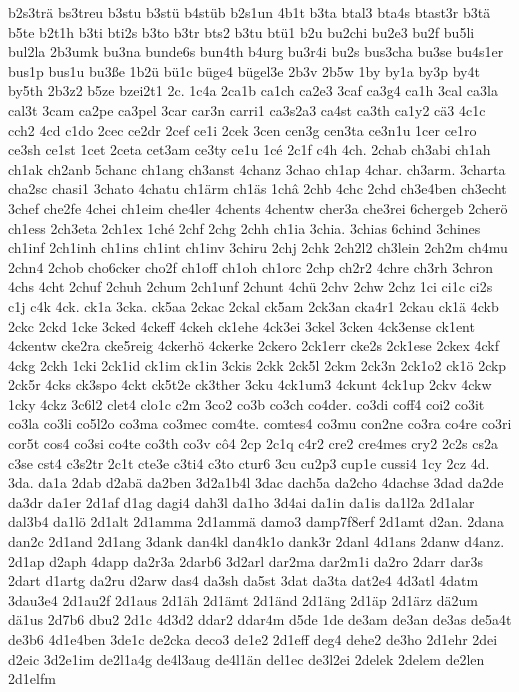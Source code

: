 {b2s3trä
bs3treu
b3stu
b3stü
b4stüb
b2s1un
4b1t
b3ta
btal3
bta4s
btast3r
b3tä
b5te
b2t1h
b3ti
bti2s
b3to
b3tr
bts2
b3tu
btü1
b2u
bu2chi
bu2e3
bu2f
bu5li
bul2la
2b3umk
bu3na
bunde6s
bun4th
b4urg
bu3r4i
bu2s
bus3cha
bu3se
bu4s1er
bus1p
bus1u
bu3ße
1b2ü
bü1c
büge4
bügel3e
2b3v
2b5w
1by
by1a
by3p
by4t
by5th
2b3z2
b5ze
bzei2t1
2c.
1c4a
2ca1b
ca1ch
ca2e3
3caf
ca3g4
ca1h
3cal
ca3la
cal3t
3cam
ca2pe
ca3pel
3car
car3n
carri1
ca3s2a3
ca4st
ca3th
ca1y2
cä3
4c1c
cch2
4cd
c1do
2cec
ce2dr
2cef
ce1i
2cek
3cen
cen3g
cen3ta
ce3n1u
1cer
ce1ro
ce3sh
ce1st
1cet
2ceta
cet3am
ce3ty
ce1u
1cé
2c1f
c4h
4ch.
2chab
ch3abi
ch1ah
ch1ak
ch2anb
5chanc
ch1ang
ch3anst
4chanz
3chao
ch1ap
4char.
ch3arm.
3charta
cha2sc
chasi1
3chato
4chatu
ch1ärm
ch1äs
1châ
2chb
4chc
2chd
ch3e4ben
ch3echt
3chef
che2fe
4chei
ch1eim
che4ler
4chents
4chentw
cher3a
che3rei
6chergeb
2cherö
ch1ess
2ch3eta
2ch1ex
1ché
2chf
2chg
2chh
ch1ia
3chia.
3chias
6chind
3chines
ch1inf
2ch1inh
ch1ins
ch1int
ch1inv
3chiru
2chj
2chk
2ch2l2
ch3lein
2ch2m
ch4mu
2chn4
2chob
cho6cker
cho2f
ch1off
ch1oh
ch1orc
2chp
ch2r2
4chre
ch3rh
3chron
4chs
4cht
2chuf
2chuh
2chum
2ch1unf
2chunt
4chü
2chv
2chw
2chz
1ci
ci1c
ci2s
c1j
c4k
4ck.
ck1a
3cka.
ck5aa
2ckac
2ckal
ck5am
2ck3an
cka4r1
2ckau
ck1ä
4ckb
2ckc
2ckd
1cke
3cked
4ckeff
4ckeh
ck1ehe
4ck3ei
3ckel
3cken
4ck3ense
ck1ent
4ckentw
cke2ra
cke5reig
4ckerhö
4ckerke
2ckero
2ck1err
cke2s
2ck1ese
2ckex
4ckf
4ckg
2ckh
1cki
2ck1id
ck1im
ck1in
3ckis
2ckk
2ck5l
2ckm
2ck3n
2ck1o2
ck1ö
2ckp
2ck5r
4cks
ck3spo
4ckt
ck5t2e
ck3ther
3cku
4ck1um3
4ckunt
4ck1up
2ckv
4ckw
1cky
4ckz
3c6l2
clet4
clo1c
c2m
3co2
co3b
co3ch
co4der.
co3di
coff4
coi2
co3it
co3la
co3li
co5l2o
co3ma
co3mec
com4te.
comtes4
co3mu
con2ne
co3ra
co4re
co3ri
cor5t
cos4
co3si
co4te
co3th
co3v
cô4
2cp
2c1q
c4r2
cre2
cre4mes
cry2
2c2s
cs2a
c3se
cst4
c3s2tr
2c1t
cte3e
c3ti4
c3to
ctur6
3cu
cu2p3
cup1e
cussi4
1cy
2cz
4d.
3da.
da1a
2dab
d2abä
da2ben
3d2a1b4l
3dac
dach5a
da2cho
4dachse
3dad
da2de
da3dr
da1er
2d1af
d1ag
dagi4
dah3l
da1ho
3d4ai
da1in
da1is
da1l2a
2d1alar
dal3b4
da1lö
2d1alt
2d1amma
2d1ammä
damo3
damp7f8erf
2d1amt
d2an.
2dana
dan2c
2d1and
2d1ang
3dank
dan4kl
dan4k1o
dank3r
2danl
4d1ans
2danw
d4anz.
2d1ap
d2aph
4dapp
da2r3a
2darb6
3d2arl
dar2ma
dar2m1i
da2ro
2darr
dar3s
2dart
d1artg
da2ru
d2arw
das4
da3sh
da5st
3dat
da3ta
dat2e4
4d3atl
4datm
3dau3e4
2d1au2f
2d1aus
2d1äh
2d1ämt
2d1änd
2d1äng
2d1äp
2d1ärz
dä2um
dä1us
2d7b6
dbu2
2d1c
4d3d2
ddar2
ddar4m
d5de
1de
de3am
de3an
de3as
de5a4t
de3b6
4d1e4ben
3de1c
de2cka
deco3
de1e2
2d1eff
deg4
dehe2
de3ho
2d1ehr
2dei
d2eic
3d2e1im
de2l1a4g
de4l3aug
de4l1än
del1ec
de3l2ei
2delek
2delem
de2len
2d1elfm
}
